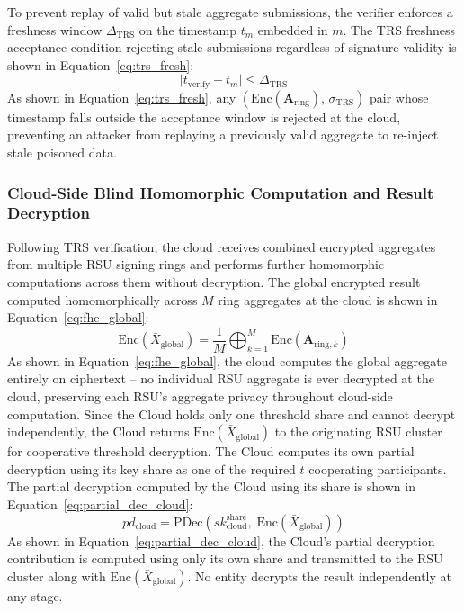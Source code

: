 \documentclass[12pt, a4paper]{report}
\begin{document}
To prevent replay of valid but stale aggregate submissions, the
verifier enforces a freshness window $\Delta_{\mathrm{TRS}}$ on the
timestamp $t_m$ embedded in $m$. The TRS freshness acceptance
condition rejecting stale submissions regardless of signature
validity is shown in Equation~\eqref{eq:trs_fresh}:
\begin{equation}
  \bigl|t_{\mathrm{verify}} - t_m\bigr|
  \leq \Delta_{\mathrm{TRS}}
  \label{eq:trs_fresh}
\end{equation}
As shown in Equation~\eqref{eq:trs_fresh}, any
$(\mathrm{Enc}(\mathbf{A}_{\mathrm{ring}}),\,\sigma_{\mathrm{TRS}})$
pair whose timestamp falls outside the acceptance window is rejected
at the cloud, preventing an attacker from replaying a previously
valid aggregate to re-inject stale poisoned data.
\subsubsection{Cloud-Side Blind Homomorphic Computation and Result Decryption}

Following TRS verification, the cloud receives combined encrypted aggregates
from multiple RSU signing rings and performs further homomorphic computations
across them without decryption. The global encrypted result computed
homomorphically across $M$ ring aggregates at the cloud is shown in
Equation~\eqref{eq:fhe_global}:
\begin{equation}
  \mathrm{Enc}(\bar{X}_{\mathrm{global}}) =
    \frac{1}{M}\bigoplus_{k=1}^{M}
    \mathrm{Enc}(\mathbf{A}_{\mathrm{ring},k})
  \label{eq:fhe_global}
\end{equation}
As shown in Equation~\eqref{eq:fhe_global}, the cloud computes the global
aggregate entirely on ciphertext -- no individual RSU aggregate is ever
decrypted at the cloud, preserving each RSU's aggregate privacy throughout
cloud-side computation. Since the Cloud holds only one threshold share and cannot decrypt
independently, the Cloud returns
$\mathrm{Enc}(\bar{X}_{\mathrm{global}})$ to the originating RSU
cluster for cooperative threshold decryption. The Cloud computes its
own partial decryption using its key share as one of the required $t$
cooperating participants. The partial decryption computed by the Cloud
using its share is shown in Equation~\eqref{eq:partial_dec_cloud}:
\begin{equation}
  pd_{\mathrm{cloud}} = \mathrm{PDec}\!\left(
    sk_{\mathrm{cloud}}^{\mathrm{share}},\;
    \mathrm{Enc}(\bar{X}_{\mathrm{global}})\right)
  \label{eq:partial_dec_cloud}
\end{equation}
As shown in Equation~\eqref{eq:partial_dec_cloud}, the Cloud's
partial decryption contribution is computed using only its own share
and transmitted to the RSU cluster along with
$\mathrm{Enc}(\bar{X}_{\mathrm{global}})$. No entity decrypts
the result independently at any stage.
\end{document}
